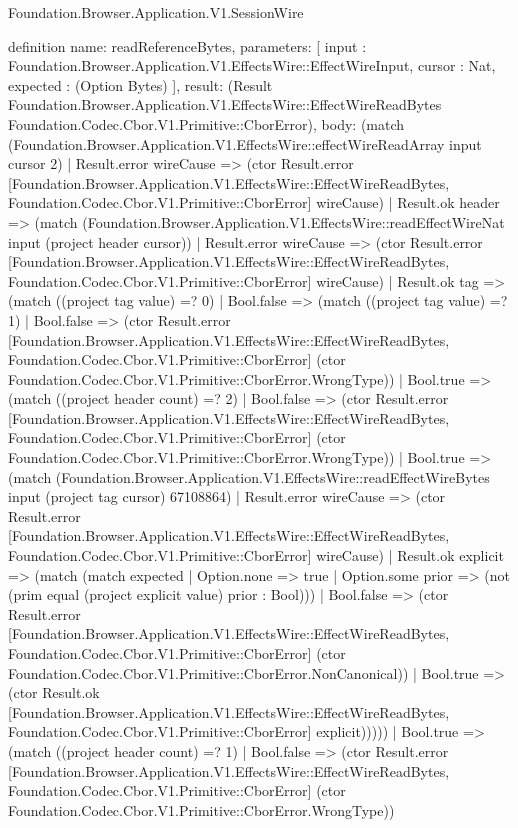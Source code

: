 \begin{lexlean}{Foundation.Browser.Application.V1.SessionWire}
\begin{semanticmodule}
definition{
  name: readReferenceBytes,
  parameters: [
    input : Foundation.Browser.Application.V1.EffectsWire::EffectWireInput,
    cursor : Nat,
    expected : (Option Bytes)
  ],
  result: (Result Foundation.Browser.Application.V1.EffectsWire::EffectWireReadBytes Foundation.Codec.Cbor.V1.Primitive::CborError),
  body: (match (Foundation.Browser.Application.V1.EffectsWire::effectWireReadArray input cursor 2)
    | Result.error wireCause => (ctor Result.error [Foundation.Browser.Application.V1.EffectsWire::EffectWireReadBytes, Foundation.Codec.Cbor.V1.Primitive::CborError] wireCause)
    | Result.ok header => (match (Foundation.Browser.Application.V1.EffectsWire::readEffectWireNat input (project header cursor))
      | Result.error wireCause => (ctor Result.error [Foundation.Browser.Application.V1.EffectsWire::EffectWireReadBytes, Foundation.Codec.Cbor.V1.Primitive::CborError] wireCause)
      | Result.ok tag => (match ((project tag value) =? 0)
        | Bool.false => (match ((project tag value) =? 1)
          | Bool.false => (ctor Result.error [Foundation.Browser.Application.V1.EffectsWire::EffectWireReadBytes, Foundation.Codec.Cbor.V1.Primitive::CborError] (ctor Foundation.Codec.Cbor.V1.Primitive::CborError.WrongType))
          | Bool.true => (match ((project header count) =? 2)
            | Bool.false => (ctor Result.error [Foundation.Browser.Application.V1.EffectsWire::EffectWireReadBytes, Foundation.Codec.Cbor.V1.Primitive::CborError] (ctor Foundation.Codec.Cbor.V1.Primitive::CborError.WrongType))
            | Bool.true => (match (Foundation.Browser.Application.V1.EffectsWire::readEffectWireBytes input (project tag cursor) 67108864)
              | Result.error wireCause => (ctor Result.error [Foundation.Browser.Application.V1.EffectsWire::EffectWireReadBytes, Foundation.Codec.Cbor.V1.Primitive::CborError] wireCause)
              | Result.ok explicit => (match (match expected
                  | Option.none => true
                  | Option.some prior => (not (prim equal (project explicit value) prior : Bool)))
                | Bool.false => (ctor Result.error [Foundation.Browser.Application.V1.EffectsWire::EffectWireReadBytes, Foundation.Codec.Cbor.V1.Primitive::CborError] (ctor Foundation.Codec.Cbor.V1.Primitive::CborError.NonCanonical))
                | Bool.true => (ctor Result.ok [Foundation.Browser.Application.V1.EffectsWire::EffectWireReadBytes, Foundation.Codec.Cbor.V1.Primitive::CborError] explicit)))))
        | Bool.true => (match ((project header count) =? 1)
          | Bool.false => (ctor Result.error [Foundation.Browser.Application.V1.EffectsWire::EffectWireReadBytes, Foundation.Codec.Cbor.V1.Primitive::CborError] (ctor Foundation.Codec.Cbor.V1.Primitive::CborError.WrongType))
}
\end{semanticmodule}
\end{lexlean}
